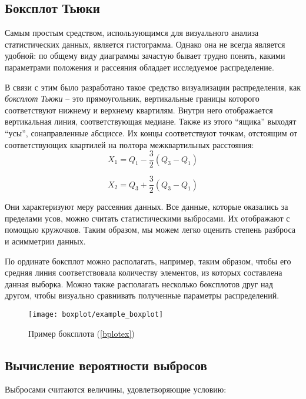 \subsection{Боксплот Тьюки}
Самым простым средством, использующимся для визуального анализа статистических данных, является гистограмма. Однако она не всегда является удобной: по общему виду диаграммы зачастую бывает трудно понять, какими параметрами положения и рассеяния обладает исследуемое распределение.

В связи с этим было разработано такое средство визуализации распределения, как \textit{боксплот Тьюки} -- это прямоугольник, вертикальные границы которого соответствуют нижнему и верхнему квартилям. Внутри него отображается вертикальная линия, соответствующая медиане. Также из этого ``ящика'' выходят ``усы'', сонаправленные абсциссе. Их концы соответствуют точкам, отстоящим от соответствующих квартилей на полтора межквартильных расстояния:
\begin{equation}
	X_1 = Q_1 - \frac{3}{2}(Q_3-Q_1)
\end{equation}

\begin{equation}
	X_2 = Q_3 + \frac{3}{2}(Q_3-Q_1)
\end{equation}

Они характеризуют меру рассеяния данных. Все данные, которые оказались за пределами усов, можно считать статистическими выбросами. Их отображают с помощью кружочков. Таким образом, мы можем легко оценить степень разброса и асимметрии данных.

По ординате боксплот можно располагать, например, таким образом, чтобы его средняя линия соответствовала количеству элементов, из которых составлена данная выборка. Можно также располагать несколько боксплотов друг над другом, чтобы визуально сравнивать полученные параметры распределений.

\begin{figure}[H]
	\begin{center}
		\texttt{[image: boxplot/example\_boxplot]}
		\caption{Пример боксплота (\ref{bplotex})}
		\label{pic:pic_name}	
	\end{center}
\end{figure}

\subsection{Вычисление вероятности выбросов}

Выбросами считаются величины, удовлетворяющие условию:


